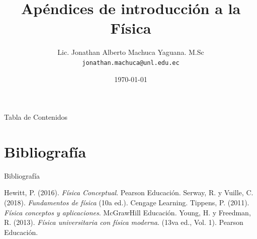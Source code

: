 \documentclass[10pt]{beamer}
\begin{document}
\title{Apéndices de introducción a la Física}

\author[M.Sc. Jonathan Machuca]{
Lic. Jonathan Alberto Machuca Yaguana. M.Sc\\
{\scriptsize \texttt{jonathan.machuca@unl.edu.ec}}}


\date{\today}


\begin{frame}[plain]
    \maketitle
\end{frame}


\begin{frame}{Tabla de Contenidos}
    \tableofcontents
\end{frame}





\section{Bibliografía}

\begin{frame}{Bibliografía}
    \begin{thebibliography}{8}
         Hewitt, P. (2016). \textit{Física Conceptual}. Pearson Educación.
         Serway, R. y Vuille, C. (2018). \textit{Fundamentos de física} (10a ed.). Cengage Learning.
         Tippens, P. (2011). \textit{Física conceptos y aplicaciones}. McGrawHill Educación.
          Young, H. y Freedman, R. (2013). \textit{Física universitaria con física moderna}. (13va ed., Vol. 1). Pearson Educación.
    \end{thebibliography}
\end{frame}
\end{document}
